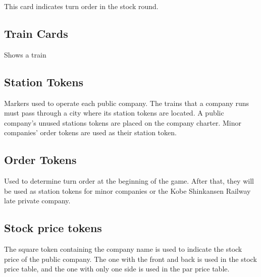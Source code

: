 \documentclass{article}
\begin{document}
\begin{CJK}{UTF8}{min}
This card indicates turn order in the stock round.


\subsection{Train Cards}
Shows a train


\subsection{Station Tokens}
Markers used to operate each public company. The trains that a company
runs must pass through a city where its station tokens are located. A
public company's unused stations tokens are placed on the company
charter. Minor companies' order tokens are used as their station
token.



\subsection{Order Tokens}
Used to determine turn order at the beginning of the game. After
that, they will be used as station tokens for minor companies or the
Kobe Shinkansen Railway late private company.



\subsection{Stock price tokens}
The square token containing the company name is used to indicate the
stock price of the public company. The one with the front and back is
used in the stock price table, and the one with only one side is used
in the par price table.




\end{CJK}
\end{document}

